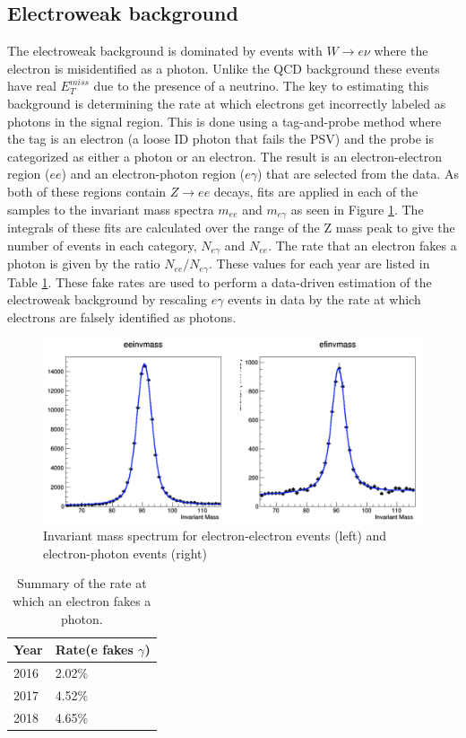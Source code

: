 \subsection{Electroweak background}
The electroweak background is dominated by events with $W \rightarrow e \nu$ where the electron is misidentified as a photon.  Unlike the QCD background these events have  real $E^{miss}_T$ due to the presence of a neutrino.  The key to estimating this background is determining the rate at which electrons get incorrectly labeled as photons in the signal region.  This is done using a tag-and-probe method where the tag is an electron (a loose ID photon that fails the PSV) and the probe is categorized as either a photon or an electron.  The result is an electron-electron region ($ee$) and an electron-photon region ($e\gamma$) that are selected from the data.    As both of these regions contain $Z\rightarrow ee$ decays, fits are applied in each of the samples to the invariant mass spectra $m_{ee}$ and $m_{e\gamma}$ as seen in Figure \ref{fig:tagandprobefits}.  The integrals of these fits are calculated over the range of the Z mass peak to give the number of events in each category, $N_{e\gamma}$ and $N_{ee}$.  The rate that an electron fakes a photon is given by the ratio $N_{ee}/N_{e\gamma}$.  These values for each year are listed in Table \ref{table:fakerates}.  These fake rates are used to perform a data-driven estimation of the electroweak background by rescaling $e\gamma$ events in data by the rate at which electrons are falsely identified as photons.
\begin{figure}[h]
	\centering
	\includegraphics[width=1.0\linewidth]{Figures/tagandprobefits}
	\caption[Tag and probe.]{Invariant mass spectrum for electron-electron events (left) and electron-photon events (right)}
	\label{fig:tagandprobefits}
\end{figure}
\begin{table}[h]
	\centering
	\caption{Summary of the rate at which an electron fakes a photon.}
	\begin{tabular}{|l|l|}
		\hline
		Year & Rate(e fakes $\gamma$)\\
		\hline
		\hline
		2016 & 2.02\% \\
		\hline
		2017 & 4.52\% \\
		\hline
		2018 & 4.65\% \\
		\hline
	\end{tabular}
	\label{table:fakerates}
\end{table}

